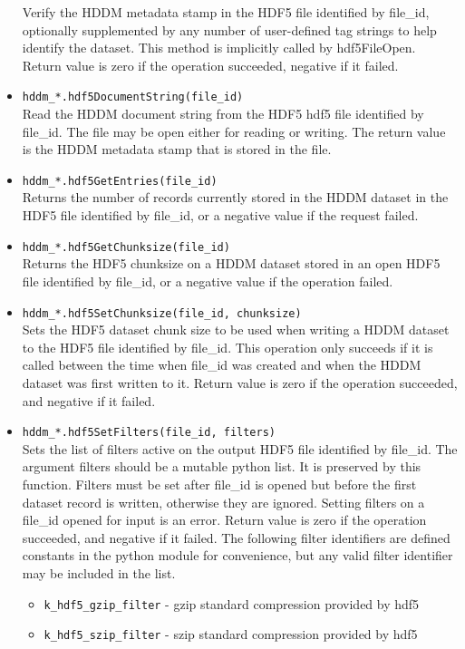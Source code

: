 \documentclass{revtex4}
\begin{document}
\begin{itemize}
Verify the HDDM metadata stamp in the HDF5 file identified by file\_id, 
optionally supplemented by any number of user-defined tag strings to help 
identify the dataset. This method is implicitly called by hdf5FileOpen. 
Return value is zero if the operation succeeded, negative if it failed.
\item \texttt{hddm\_*.hdf5DocumentString(file\_id)}\\
Read the HDDM document string from the HDF5 hdf5 file identified by file\_id.
The file may be open either for reading or writing. The return value is the
HDDM metadata stamp that is stored in the file.
\item \texttt{hddm\_*.hdf5GetEntries(file\_id)}\\
Returns the number of records currently stored in the HDDM dataset in the HDF5
file identified by file\_id, or a negative value if the request failed.
\item \texttt{hddm\_*.hdf5GetChunksize(file\_id)}\\
Returns the HDF5 chunksize on a HDDM dataset stored in an open HDF5 file 
identified by file\_id, or a negative value if the operation failed. 
\item \texttt{hddm\_*.hdf5SetChunksize(file\_id, chunksize)}\\
Sets the HDF5 dataset chunk size to be used when writing a HDDM dataset to the
HDF5 file identified by file\_id. This operation only succeeds if it is called
between the time when file\_id was created and when the HDDM dataset was first
written to it. Return value is zero if the operation succeeded, and negative
if it failed.
\item \texttt{hddm\_*.hdf5SetFilters(file\_id, filters)}\\
Sets the list of filters active on the output HDF5 file identified by file\_id.
The argument filters should be a mutable python list. It is preserved by this
function. Filters must be set after file\_id is opened but before the first
dataset record is written, otherwise they are ignored. Setting filters on a
file\_id opened for input is an error. Return value is zero if the operation
succeeded, and negative if it failed. The following filter identifiers are 
defined constants in the python module for convenience, but any valid filter
identifier may be included in the list.
\begin{itemize}
\item \texttt{k\_hdf5\_gzip\_filter} - gzip standard compression provided by hdf5
\item \texttt{k\_hdf5\_szip\_filter} - szip standard compression provided by hdf5

\end{itemize}
\end{itemize}
\end{document}
